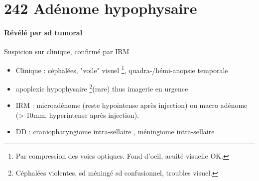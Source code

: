 \documentclass{book}
\begin{document}
\section{242 Adénome hypophysaire}
\label{sec:org05d0653}
\paragraph{Révélé par sd tumoral}
\label{sec:org9004612}
Suspicion sur clinique, confirmé par IRM
\begin{itemize}
\item Clinique : céphalées, "voile" visuel \footnote{Par compression des voies optiques. Fond d'oeil,
acuité visuelle OK.}, quadra-/hémi-anopsie temporale
\item \danger apoplexie hypophysaire \footnote{Céphalées violentes, sd méningé sd confusionnel, troubles visuel.}(rare) thus imagerie en urgence \danger
\item IRM : microadénome (reste hypointense après injection) ou macro adénome (>
10mm, hyperintense après injection).
\item DD : craniopharyngiome intra-sellaire , méningiome intra-sellaire
\end{itemize}
\end{document}
